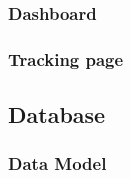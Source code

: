\subsubsection{Dashboard}
\subsubsection{Tracking page}
\subsection{Database}
\label{subsec:database}
\subsubsection{Data Model}
\label{subsubsec:data-model}
